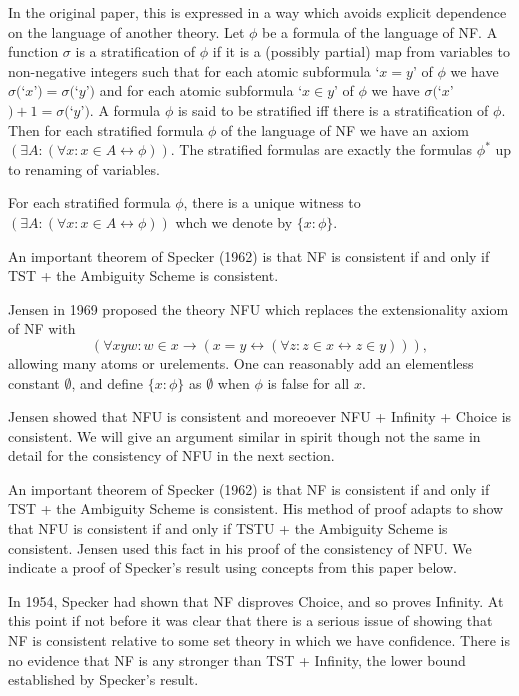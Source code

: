 \documentclass[12pt]{article}
\begin{document}
In the original paper, this is expressed in a way which avoids explicit dependence on the language of another theory.  Let $\phi$ be a formula of the language of
NF.  A function $\sigma$ is a stratification of $\phi$ if it is a (possibly partial) map from variables to non-negative integers such that for each atomic subformula
`$x=y$'  of $\phi$ we have $\sigma($`$x$'$)=\sigma($`$y$'$)$ and for each atomic subformula `$x \in y$' of $\phi$ we have $\sigma($`$x$'$)+1 = \sigma($`$y$'$)$.
A formula $\phi$ is said to be stratified iff there is a stratification of $\phi$.  Then for each stratified formula $\phi$ of the language of NF we have an axiom $(\exists A:(\forall x:x \in A \leftrightarrow \phi))$.  The stratified formulas are exactly the formulas $\phi^*$ up to renaming of variables.

For each stratified formula $\phi$, there is a unique witness to $(\exists A:(\forall x:x \in A \leftrightarrow \phi))$ whch we denote by $\{x:\phi\}$.

An important theorem of Specker (1962) is that NF is consistent if and only if TST + the Ambiguity Scheme is consistent.

Jensen in 1969 proposed the theory NFU which replaces the extensionality axiom of NF with $$(\forall xyw:w \in x \rightarrow (x=y \leftrightarrow (\forall z:z \in x \leftrightarrow z\in y))),$$  allowing many atoms or urelements.  One can reasonably add an elementless constant $\emptyset$, and define $\{x:\phi\}$ as $\emptyset$ when $\phi$ is false for all $x$.

Jensen showed that NFU is consistent and moreoever NFU + Infinity + Choice is consistent.  We will give an argument similar in spirit though not the same in detail for the consistency of NFU in the next section.

An important theorem of Specker (1962) is that NF is consistent if and only if TST + the Ambiguity Scheme is consistent.  His method of proof adapts to show that  NFU is consistent if and only if TSTU + the Ambiguity Scheme is consistent.  Jensen used this fact in his proof of the consistency of NFU.  We indicate a proof of Specker's result using concepts from this paper below.

In 1954, Specker had shown that NF disproves Choice, and so proves Infinity.  At this point if not before it was clear that there is a serious issue of showing that NF is consistent relative to some set theory in which we have confidence.  There is no evidence that NF is any stronger than TST + Infinity, the lower bound established by Specker's result.
\end{document}
